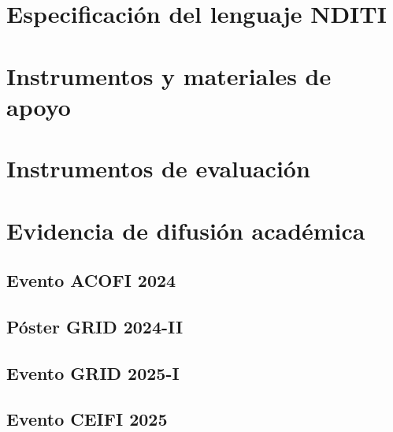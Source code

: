 \appendix

\chapter{Especificación del lenguaje NDITI}


\newpage


\chapter{Instrumentos y materiales de apoyo}


\newpage


\newpage

\chapter{Instrumentos de evaluación}


\newpage



\chapter{Evidencia de difusión académica}

\section{Evento ACOFI 2024}



\section{Póster GRID 2024-II}



\section{Evento GRID 2025-I}



\section{Evento CEIFI 2025}


